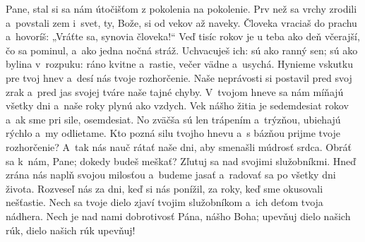 Pane, stal si sa nám útočišťom
z pokolenia na pokolenie.
\versseparator
Prv než sa vrchy zrodili a~povstali zem i~svet,
ty, Bože, si od vekov až naveky.
\versseparator
Človeka vraciaš do prachu
a~hovoríš: „Vráťte sa, synovia človeka!“
\versseparator
Veď tisíc rokov je u teba
ako deň včerajší, čo sa pominul,
\versseparator
a~ako jedna nočná stráž.
Uchvacuješ ich: sú ako ranný sen;
\versseparator
sú ako bylina v~rozpuku:
ráno kvitne a~rastie,
večer vädne a~usychá.
\versseparator
Hynieme vskutku pre tvoj hnev
a~desí nás tvoje rozhorčenie.
\versseparator
Naše neprávosti si postavil pred svoj zrak
a~pred jas svojej tváre naše tajné chyby.
\versseparator
V~tvojom hneve sa nám míňajú všetky dni
\versseparator
a~naše roky plynú ako vzdych.
Vek nášho žitia je sedemdesiat rokov
\versseparator
a~ak sme pri sile, osemdesiat.
No zväčša sú len trápením a~trýzňou,
\versseparator
ubiehajú rýchlo a~my odlietame.
\versseparator
Kto pozná silu tvojho hnevu
a~s bázňou prijme tvoje rozhorčenie?
\versseparator
A~tak nás nauč rátať naše dni,
aby smenašli múdrosť srdca.
\versseparator
Obráť sa k~nám, Pane; dokedy budeš meškať?
Zľutuj sa nad svojimi služobníkmi.
\versseparator
Hneď zrána nás naplň svojou milosťou
a~budeme jasať a~radovať sa po všetky dni života.
\versseparator
Rozveseľ nás za dni, keď si nás ponížil,
za roky, keď sme okusovali nešťastie.
\versseparator
Nech sa tvoje dielo zjaví tvojim služobníkom
a~ich deťom tvoja nádhera.
\versseparator
Nech je nad nami dobrotivosť Pána, nášho Boha;
upevňuj dielo našich rúk,
dielo našich rúk upevňuj!